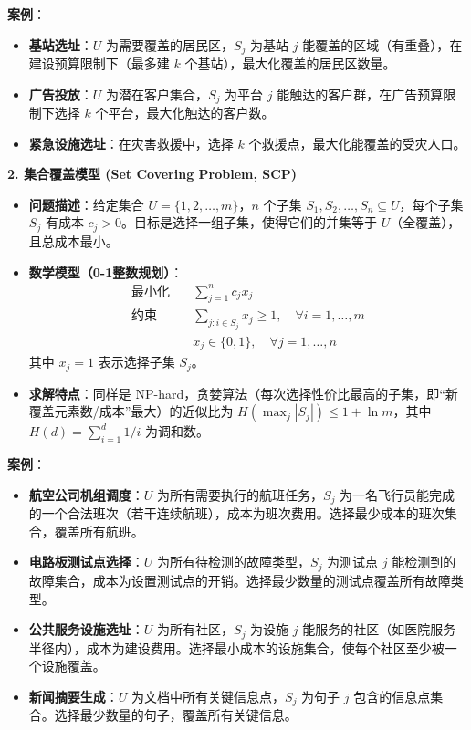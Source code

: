 \documentclass[UTF8]{article}
\begin{document}
\textbf{案例}：
\begin{itemize}[leftmargin=1.5em]
    \item \textbf{基站选址}：$U$ 为需要覆盖的居民区，$S_j$ 为基站 $j$ 能覆盖的区域（有重叠），在建设预算限制下（最多建 $k$ 个基站），最大化覆盖的居民区数量。
    \item \textbf{广告投放}：$U$ 为潜在客户集合，$S_j$ 为平台 $j$ 能触达的客户群，在广告预算限制下选择 $k$ 个平台，最大化触达的客户数。
    \item \textbf{紧急设施选址}：在灾害救援中，选择 $k$ 个救援点，最大化能覆盖的受灾人口。
\end{itemize}

\vspace{1em}
\textbf{2. 集合覆盖模型 (Set Covering Problem, SCP)}
\vspace{0.5em}

\begin{itemize}[leftmargin=1.5em]
    \item \textbf{问题描述}：给定集合 $U = \{1, 2, \dots, m\}$，$n$ 个子集 $S_1, S_2, \dots, S_n \subseteq U$，每个子集 $S_j$ 有成本 $c_j > 0$。目标是选择一组子集，使得它们的并集等于 $U$（全覆盖），且总成本最小。
    
    \item \textbf{数学模型（0-1整数规划）}：
    \begin{align}
        \text{最小化} \quad & \sum_{j=1}^n c_j x_j \\
        \text{约束} \quad & \sum_{j: i \in S_j} x_j \geq 1, \quad \forall i = 1,\dots,m \\
        & x_j \in \{0,1\}, \quad \forall j = 1,\dots,n
    \end{align}
    其中 $x_j = 1$ 表示选择子集 $S_j$。
    
    \item \textbf{求解特点}：同样是 NP-hard，贪婪算法（每次选择性价比最高的子集，即“新覆盖元素数/成本”最大）的近似比为 $H(\max_j |S_j|) \leq 1 + \ln m$，其中 $H(d) = \sum_{i=1}^d 1/i$ 为调和数。
\end{itemize}

\textbf{案例}：
\begin{itemize}[leftmargin=1.5em]
    \item \textbf{航空公司机组调度}：$U$ 为所有需要执行的航班任务，$S_j$ 为一名飞行员能完成的一个合法班次（若干连续航班），成本为班次费用。选择最少成本的班次集合，覆盖所有航班。
    \item \textbf{电路板测试点选择}：$U$ 为所有待检测的故障类型，$S_j$ 为测试点 $j$ 能检测到的故障集合，成本为设置测试点的开销。选择最少数量的测试点覆盖所有故障类型。
    \item \textbf{公共服务设施选址}：$U$ 为所有社区，$S_j$ 为设施 $j$ 能服务的社区（如医院服务半径内），成本为建设费用。选择最小成本的设施集合，使每个社区至少被一个设施覆盖。
    \item \textbf{新闻摘要生成}：$U$ 为文档中所有关键信息点，$S_j$ 为句子 $j$ 包含的信息点集合。选择最少数量的句子，覆盖所有关键信息。
\end{itemize}
\end{document}
